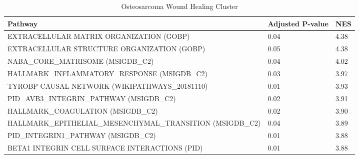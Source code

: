 \documentclass[varwidth=1000pt,border=10pt,convert={size=640x}]{standalone}
\begin{document}
	\begin{table}[h]
		\caption{Osteosarcoma Wound Healing Cluster}
		\begin{tabular}{L{10cm}R{1.5cm}R{1.5cm}}
	\toprule
	Pathway &  Adjusted P-value &   NES \\
	\midrule
	EXTRACELLULAR MATRIX ORGANIZATION (GOBP) &  0.04 &  4.38 \\
	EXTRACELLULAR STRUCTURE ORGANIZATION (GOBP) &  0.05 &  4.38 \\
	NABA\_CORE\_MATRISOME (MSIGDB\_C2) &  0.04 &  4.02 \\
	HALLMARK\_INFLAMMATORY\_RESPONSE (MSIGDB\_C2) &  0.03 &  3.97 \\
	TYROBP CAUSAL NETWORK (WIKIPATHWAYS\_20181110) &  0.01 &  3.93 \\
	PID\_AVB3\_INTEGRIN\_PATHWAY (MSIGDB\_C2) &  0.02 &  3.91 \\
	HALLMARK\_COAGULATION (MSIGDB\_C2) &  0.02 &  3.90 \\
	HALLMARK\_EPITHELIAL\_MESENCHYMAL\_TRANSITION (MSIGDB\_C2) &  0.04 &  3.89 \\
	PID\_INTEGRIN1\_PATHWAY (MSIGDB\_C2) &  0.01 &  3.88 \\
	BETA1 INTEGRIN CELL SURFACE INTERACTIONS (PID) &  0.01 &  3.88 \\
	\bottomrule
\end{tabular}

	\end{table}
\end{document}
